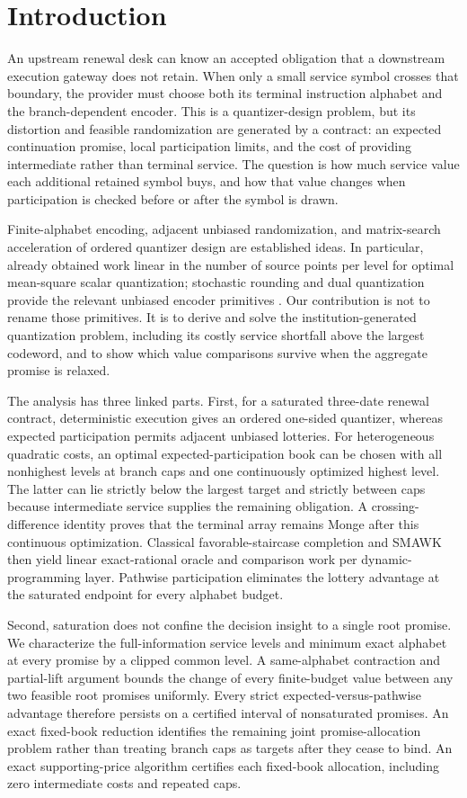 \section{Introduction}
An upstream renewal desk can know an accepted obligation that a downstream execution gateway does not retain. When only a small service symbol crosses that boundary, the provider must choose both its terminal instruction alphabet and the branch-dependent encoder. This is a quantizer-design problem, but its distortion and feasible randomization are generated by a contract: an expected continuation promise, local participation limits, and the cost of providing intermediate rather than terminal service. The question is how much service value each additional retained symbol buys, and how that value changes when participation is checked before or after the symbol is drawn.

Finite-alphabet encoding, adjacent unbiased randomization, and matrix-search acceleration of ordered quantizer design are established ideas. In particular, \citet{Wu1991} already obtained work linear in the number of source points per level for optimal mean-square scalar quantization; stochastic rounding and dual quantization provide the relevant unbiased encoder primitives \citep{CrociEtAl2022,PagesWilbertz2012}. Our contribution is not to rename those primitives. It is to derive and solve the institution-generated quantization problem, including its costly service shortfall above the largest codeword, and to show which value comparisons survive when the aggregate promise is relaxed.

The analysis has three linked parts. First, for a saturated three-date renewal contract, deterministic execution gives an ordered one-sided quantizer, whereas expected participation permits adjacent unbiased lotteries. For heterogeneous quadratic costs, an optimal expected-participation book can be chosen with all nonhighest levels at branch caps and one continuously optimized highest level. The latter can lie strictly below the largest target and strictly between caps because intermediate service supplies the remaining obligation. A crossing-difference identity proves that the terminal array remains Monge after this continuous optimization. Classical favorable-staircase completion and SMAWK then yield linear exact-rational oracle and comparison work per dynamic-programming layer. Pathwise participation eliminates the lottery advantage at the saturated endpoint for every alphabet budget.

Second, saturation does not confine the decision insight to a single root promise. We characterize the full-information service levels and minimum exact alphabet at every promise by a clipped common level. A same-alphabet contraction and partial-lift argument bounds the change of every finite-budget value between any two feasible root promises uniformly. Every strict expected-versus-pathwise advantage therefore persists on a certified interval of nonsaturated promises. An exact fixed-book reduction identifies the remaining joint promise-allocation problem rather than treating branch caps as targets after they cease to bind. An exact supporting-price algorithm certifies each fixed-book allocation, including zero intermediate costs and repeated caps.

